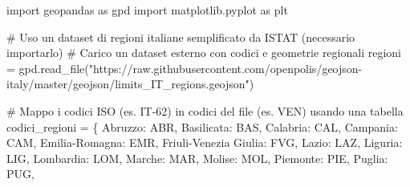 \documentclass[
  letterpaper,
  DIV=11,
  numbers=noendperiod]{scrartcl}
\newenvironment{Shaded}{\begin{snugshade}}{\end{snugshade}}
\newcommand{\CommentTok}[1]{\textcolor[rgb]{0.37,0.37,0.37}{#1}}
\newcommand{\ImportTok}[1]{\textcolor[rgb]{0.00,0.46,0.62}{#1}}
\newcommand{\NormalTok}[1]{\textcolor[rgb]{0.00,0.23,0.31}{#1}}
\newcommand{\OperatorTok}[1]{\textcolor[rgb]{0.37,0.37,0.37}{#1}}
\newcommand{\StringTok}[1]{\textcolor[rgb]{0.13,0.47,0.30}{#1}}
\begin{document}
\label{fig2}
\begin{Shaded}
\begin{Highlighting}[]
\ImportTok{import}\NormalTok{ geopandas }\ImportTok{as}\NormalTok{ gpd}
\ImportTok{import}\NormalTok{ matplotlib.pyplot }\ImportTok{as}\NormalTok{ plt}

\CommentTok{\# Uso un dataset di regioni italiane semplificato da ISTAT (necessario importarlo)}
\CommentTok{\# Carico un dataset esterno con codici e geometrie regionali}
\NormalTok{regioni }\OperatorTok{=}\NormalTok{ gpd.read\_file(}\StringTok{"https://raw.githubusercontent.com/openpolis/geojson{-}italy/master/geojson/limits\_IT\_regions.geojson"}\NormalTok{)}

\CommentTok{\# Mappo i codici ISO (es. \textquotesingle{}IT{-}62\textquotesingle{}) in codici del file (es. \textquotesingle{}VEN\textquotesingle{}) usando una tabella}
\NormalTok{codici\_regioni }\OperatorTok{=}\NormalTok{ \{}
    \StringTok{\textquotesingle{}Abruzzo\textquotesingle{}}\NormalTok{: }\StringTok{\textquotesingle{}ABR\textquotesingle{}}\NormalTok{, }\StringTok{\textquotesingle{}Basilicata\textquotesingle{}}\NormalTok{: }\StringTok{\textquotesingle{}BAS\textquotesingle{}}\NormalTok{, }\StringTok{\textquotesingle{}Calabria\textquotesingle{}}\NormalTok{: }\StringTok{\textquotesingle{}CAL\textquotesingle{}}\NormalTok{, }\StringTok{\textquotesingle{}Campania\textquotesingle{}}\NormalTok{: }\StringTok{\textquotesingle{}CAM\textquotesingle{}}\NormalTok{,}
    \StringTok{\textquotesingle{}Emilia{-}Romagna\textquotesingle{}}\NormalTok{: }\StringTok{\textquotesingle{}EMR\textquotesingle{}}\NormalTok{, }\StringTok{\textquotesingle{}Friuli{-}Venezia Giulia\textquotesingle{}}\NormalTok{: }\StringTok{\textquotesingle{}FVG\textquotesingle{}}\NormalTok{, }\StringTok{\textquotesingle{}Lazio\textquotesingle{}}\NormalTok{: }\StringTok{\textquotesingle{}LAZ\textquotesingle{}}\NormalTok{, }\StringTok{\textquotesingle{}Liguria\textquotesingle{}}\NormalTok{: }\StringTok{\textquotesingle{}LIG\textquotesingle{}}\NormalTok{,}
    \StringTok{\textquotesingle{}Lombardia\textquotesingle{}}\NormalTok{: }\StringTok{\textquotesingle{}LOM\textquotesingle{}}\NormalTok{, }\StringTok{\textquotesingle{}Marche\textquotesingle{}}\NormalTok{: }\StringTok{\textquotesingle{}MAR\textquotesingle{}}\NormalTok{, }\StringTok{\textquotesingle{}Molise\textquotesingle{}}\NormalTok{: }\StringTok{\textquotesingle{}MOL\textquotesingle{}}\NormalTok{, }\StringTok{\textquotesingle{}Piemonte\textquotesingle{}}\NormalTok{: }\StringTok{\textquotesingle{}PIE\textquotesingle{}}\NormalTok{, }\StringTok{\textquotesingle{}Puglia\textquotesingle{}}\NormalTok{: }\StringTok{\textquotesingle{}PUG\textquotesingle{}}\NormalTok{,}

\end{Highlighting}
\end{Shaded}
\end{document}
